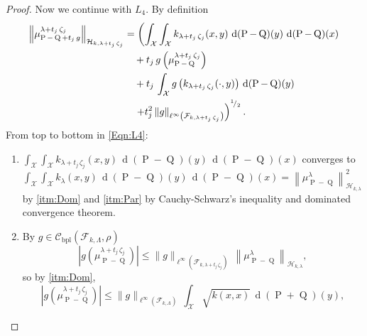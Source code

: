 \begin{proof}
				Now we continue with $L_{4}$. By definition
				\begin{equation}\label{Eqn:L4}
					\begin{aligned}
						\left\|\mu_{\operatorname{P}-\operatorname{Q}+t_{j}\,g}^{\lambda+t_{j}\,\zeta_{j}}\right\|_{\mathcal{H}_{k,\lambda+t_{j}\,\zeta_{j}}}&=\left(\int_{\mathcal{X}}\int_{\mathcal{X}}k_{\lambda+t_{j}\,\zeta_{j}}(x,y)\,\operatorname{d}(\operatorname{P}-\operatorname{Q})(y)\,\operatorname{d}(\operatorname{P}-\operatorname{Q})(x)\right.
						\\
						&\quad+t_{j}\,g\left(\mu_{\operatorname{P}-\operatorname{Q}}^{\lambda+t_{j}\,\zeta_{j}}\right)
						\\
						&\quad+t_{j}\,\int_{\mathcal{X}}g\left(k_{\lambda+t_{j}\,\zeta_{j}}(\cdot,y)\right)\,\operatorname{d}(\operatorname{P}-\operatorname{Q})(y)
						\\
						&\quad\left.+t_{j}^{2}\,\|g\|_{\ell^{\infty}\left(\mathcal{F}_{k,\lambda+t_{j}\,\zeta_{j}}\right)}\right)^{^{1}\!/_{2}}.
					\end{aligned}
				\end{equation}
				From top to bottom in \eqref{Eqn:L4}:
				\begin{enumerate}
					\item $\displaystyle\int_{\mathcal{X}}\int_{\mathcal{X}}k_{\lambda+t_{j}\,\zeta_{j}}(x,y)\,\operatorname{d}(\operatorname{P}-\operatorname{Q})(y)\,\operatorname{d}(\operatorname{P}-\operatorname{Q})(x)$ converges to\break$\displaystyle\int_{\mathcal{X}}\int_{\mathcal{X}}k_{\lambda}(x,y)\,\operatorname{d}(\operatorname{P}-\operatorname{Q})(y)\,\operatorname{d}(\operatorname{P}-\operatorname{Q})(x)=\left\|\mu_{\operatorname{P}-\operatorname{Q}}^{\lambda}\right\|_{\mathcal{H}_{k,\lambda}}^{2}$ by \ref{itm:Dom} and \ref{itm:Par} by Cauchy-Schwarz's inequality and dominated convergence theorem.
					\item By $g\in\mathcal{C}_{\operatorname{bpl}}\left(\mathcal{F}_{k,\Lambda},\rho\right)$
					\begin{equation}
						\left|g\left(\mu_{\operatorname{P}-\operatorname{Q}}^{\lambda+t_{j}\,\zeta_{j}}\right)\right|\leq\|g\|_{\ell^{\infty}\left(\mathcal{F}_{k,\lambda+t_{j}\,\zeta_{j}}\right)}\,\left\|\mu_{\operatorname{P}-\operatorname{Q}}^{\lambda}\right\|_{\mathcal{H}_{k,\lambda}},
					\end{equation}
					so by \ref{itm:Dom},
					\begin{equation}
						\left|g\left(\mu_{\operatorname{P}-\operatorname{Q}}^{\lambda+t_{j}\,\zeta_{j}}\right)\right|\leq\|g\|_{\ell^{\infty}\left(\mathcal{F}_{k,\Lambda}\right)}\,\int_{\mathcal{X}}\sqrt{k(x,x)}\,\operatorname{d}(\operatorname{P}+\operatorname{Q})(y),

\end{equation}
\end{enumerate}
\end{proof}
